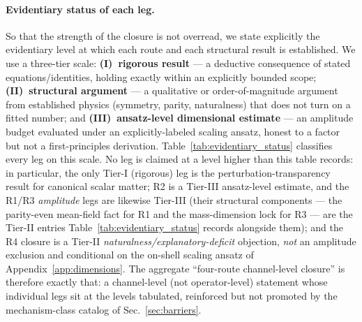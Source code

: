 \documentclass[aps,prd,twocolumn,superscriptaddress,showpacs,preprintnumbers,nofootinbib,longbibliography,floatfix]{revtex4-2}
\begin{document}
\paragraph{Evidentiary status of each leg.} So that the strength of
the closure is not overread, we state explicitly the evidentiary level
at which each route and each structural result is established. We use a
three-tier scale: \textbf{(I)~rigorous result} --- a deductive
consequence of stated equations/identities, holding exactly within an
explicitly bounded scope; \textbf{(II)~structural argument} --- a
qualitative or order-of-magnitude argument from established physics
(symmetry, parity, naturalness) that does not turn on a fitted number;
and \textbf{(III)~ansatz-level dimensional estimate} --- an
amplitude budget evaluated under an explicitly-labeled scaling ansatz,
honest to a factor but not a first-principles derivation.
Table~\ref{tab:evidentiary_status} classifies every leg on this scale.
No leg is claimed at a level higher than this table records: in
particular, the only Tier-I (rigorous) leg is the
perturbation-transparency result for canonical scalar matter; R2 is a
Tier-III ansatz-level estimate, and the R1/R3 \emph{amplitude} legs are
likewise Tier-III (their structural components --- the parity-even
mean-field fact for R1 and the mass-dimension lock for R3 --- are the
Tier-II entries Table~\ref{tab:evidentiary_status} records alongside
them); and the R4 closure is a Tier-II
\emph{naturalness/explanatory-deficit} objection, \emph{not} an amplitude
exclusion and conditional on the on-shell scaling ansatz of
Appendix~\ref{app:dimensions}. The aggregate ``four-route channel-level
closure'' is therefore exactly that: a channel-level (not operator-level)
statement whose individual legs sit at the levels tabulated, reinforced
but not promoted by the mechanism-class catalog of
Sec.~\ref{sec:barriers}.
\end{document}
